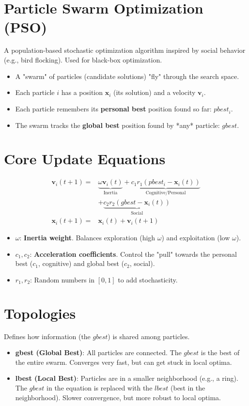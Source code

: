 \documentclass[8pt,a4paper,twocolumn]{article}
\newcommand{\xx}{\mathbf{x}}
\newcommand{\vv}{\mathbf{v}}
\newcommand{\0}{\mathbf{0}}
\begin{document}
\section*{Particle Swarm Optimization (PSO)}
A population-based stochastic optimization algorithm inspired by social behavior (e.g., bird flocking). Used for black-box optimization.
\begin{itemize}
    \item A "swarm" of particles (candidate solutions) "fly" through the search space.
    \item Each particle $i$ has a position $\xx_i$ (its solution) and a velocity $\vv_i$.
    \item Each particle remembers its \textbf{personal best} position found so far: $\textit{pbest}_i$.
    \item The swarm tracks the \textbf{global best} position found by *any* particle: $\textit{gbest}$.
\end{itemize}

\section*{Core Update Equations}
\begin{align*}
\vv_i(t+1) = & \underbrace{\omega \vv_i(t)}_{\text{Inertia}} + \underbrace{c_1 r_1 (pbest_i - \xx_i(t))}_{\text{Cognitive/Personal}} \\
& + \underbrace{c_2 r_2 (gbest - \xx_i(t))}_{\text{Social}} \\
\xx_i(t+1) = & \xx_i(t) + \vv_i(t+1)
\end{align*}
\begin{itemize}
    \item $\omega$: \textbf{Inertia weight}. Balances exploration (high $\omega$) and exploitation (low $\omega$).
    \item $c_1, c_2$: \textbf{Acceleration coefficients}. Control the "pull" towards the personal best ($c_1$, cognitive) and global best ($c_2$, social).
    \item $r_1, r_2$: Random numbers in $[0,1]$ to add stochasticity.
\end{itemize}

\section*{Topologies}
Defines how information (the $\textit{gbest}$) is shared among particles.
\begin{itemize}
    \item \textbf{gbest (Global Best)}: All particles are connected. The $\textit{gbest}$ is the best of the entire swarm. Converges very fast, but can get stuck in local optima.
    \item \textbf{lbest (Local Best)}: Particles are in a smaller neighborhood (e.g., a ring). The $\textit{gbest}$ in the equation is replaced with the $\textit{lbest}$ (best in the neighborhood). Slower convergence, but more robust to local optima.
\end{itemize}
\end{document}
